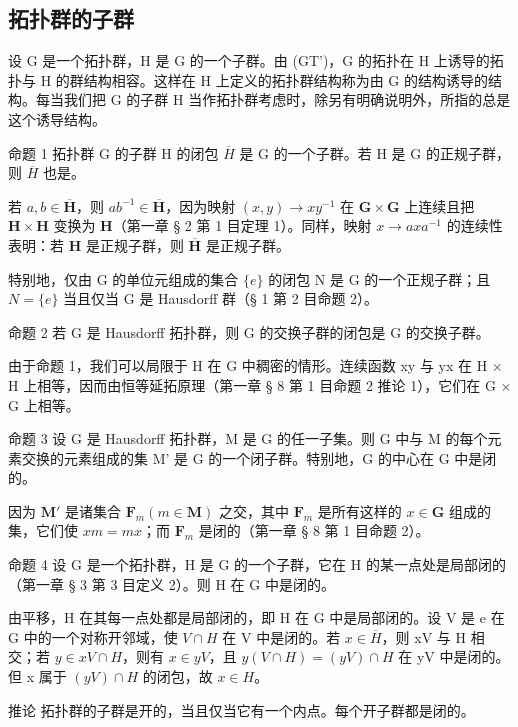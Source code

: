 \subsection{拓扑群的子群}

设 G 是一个拓扑群，H 是 G 的一个子群。由 (GT')，G 的拓扑在 H 上诱导的拓扑与 H 的群结构相容。这样在 H 上定义的拓扑群结构称为由 G 的结构诱导的结构。每当我们把 G 的子群 H 当作拓扑群考虑时，除另有明确说明外，所指的总是这个诱导结构。

命题 1 拓扑群 G 的子群 H 的闭包 \(\overline{H}\) 是 G 的一个子群。若 H 是 G 的正规子群，则 \(\overline{H}\) 也是。

若 \(a, b \in \overline{\mathbf{H}}\)，则 \(ab^{-1} \in \overline{\mathbf{H}}\)，因为映射 \((x, y) \to xy^{-1}\) 在 \(\mathbf{G} \times \mathbf{G}\) 上连续且把 \(\mathbf{H} \times \mathbf{H}\) 变换为 \(\mathbf{H}\)（第一章 § 2 第 1 目定理 1）。同样，映射 \(x \to axa^{-1}\) 的连续性表明：若 \(\mathbf{H}\) 是正规子群，则 \(\overline{\mathbf{H}}\) 是正规子群。

特别地，仅由 G 的单位元组成的集合 \(\{e\}\) 的闭包 N 是 G 的一个正规子群；且 \(N=\{e\}\) 当且仅当 G 是 Hausdorff 群（§ 1 第 2 目命题 2）。

命题 2 若 G 是 Hausdorff 拓扑群，则 G 的交换子群的闭包是 G 的交换子群。

由于命题 1，我们可以局限于 H 在 G 中稠密的情形。连续函数 xy 与 yx 在 H × H 上相等，因而由恒等延拓原理（第一章 § 8 第 1 目命题 2 推论 1），它们在 G × G 上相等。

命题 3 设 G 是 Hausdorff 拓扑群，M 是 G 的任一子集。则 G 中与 M 的每个元素交换的元素组成的集 M' 是 G 的一个闭子群。特别地，G 的中心在 G 中是闭的。

因为 \(\mathbf{M}'\) 是诸集合 \(\mathbf{F}_m(m \in \mathbf{M})\) 之交，其中 \(\mathbf{F}_m\) 是所有这样的 \(x \in \mathbf{G}\) 组成的集，它们使 \(xm = mx\)；而 \(\mathbf{F}_m\) 是闭的（第一章 § 8 第 1 目命题 2）。

命题 4 设 G 是一个拓扑群，H 是 G 的一个子群，它在 H 的某一点处是局部闭的（第一章 § 3 第 3 目定义 2）。则 H 在 G 中是闭的。

由平移，H 在其每一点处都是局部闭的，即 H 在 G 中是局部闭的。设 V 是 e 在 G 中的一个对称开邻域，使 \(V \cap H\) 在 V 中是闭的。若 \(x \in \overline{H}\)，则 xV 与 H 相交；若 \(y \in xV \cap H\)，则有 \(x \in yV\)，且 \(y(V \cap H) = (yV) \cap H\) 在 yV 中是闭的。但 x 属于 \((yV) \cap H\) 的闭包，故 \(x \in H\)。

推论 拓扑群的子群是开的，当且仅当它有一个内点。每个开子群都是闭的。

